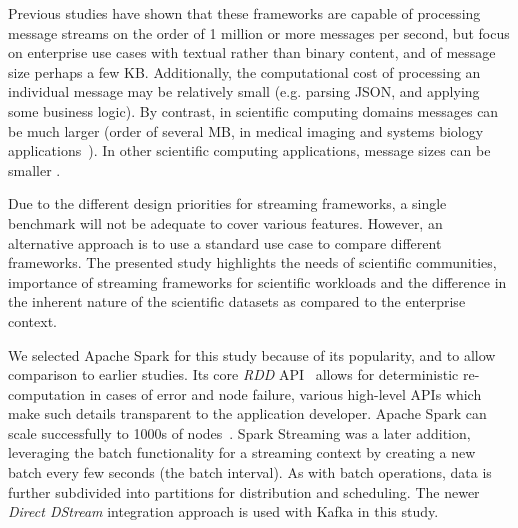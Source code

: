 \documentclass[letterpaper,conference]{IEEEtran}
\begin{document}
Previous studies have shown that these frameworks are capable of processing message streams on the order of 1 million or more messages per second, but focus on enterprise use cases with textual rather than binary content, and of message size perhaps a few KB. Additionally, the computational cost of processing an individual message may be relatively small (e.g. parsing JSON, and applying some business logic). By contrast, in scientific computing domains messages can be much larger (order of several MB, in medical imaging and systems biology applications~\cite{blameyAdaptingSecretaryHiring2019}). In other scientific computing applications, message sizes can be smaller \cite{CharacterizationDOEMiniapps}.

Due to the different design priorities for streaming frameworks, a single benchmark will not be adequate to cover various features. However, an alternative approach is to use a standard use case to compare different frameworks. The presented study highlights the needs of scientific communities, importance of streaming frameworks for scientific workloads and the difference in the inherent nature of the scientific datasets as compared to the enterprise context.

We selected Apache Spark for this study because of its popularity, and to allow comparison to earlier studies. Its core \emph{RDD} API~\cite{Zaharia:2012:RDD:2228298.2228301} allows for deterministic re-computation in cases of error and node failure, various high-level APIs which make such details transparent to the application developer. Apache Spark can scale successfully to 1000s of nodes~\cite{xinApacheSparkFastest2014}. Spark Streaming was a later addition, leveraging the batch functionality for a streaming context by creating a new batch every few seconds (the batch interval). As with batch operations, data is further subdivided into partitions for distribution and scheduling. The newer \emph{Direct DStream} integration approach is used with Kafka in this study. 

\end{document}
